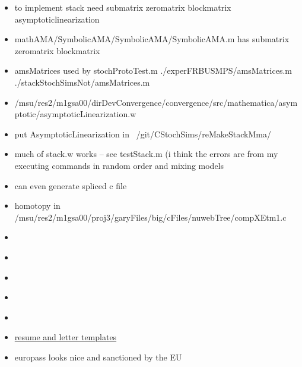 \documentclass[hyperref]{labbook}
\begin{document}
\begin{itemize}
\item to implement stack need submatrix zeromatrix  blockmatrix asymptoticlinearization
\item mathAMA/SymbolicAMA/SymbolicAMA/SymbolicAMA.m has submatrix zeromatrix  blockmatrix 
\item amsMatrices used by stochProtoTest.m  ./experFRBUSMPS/amsMatrices.m
./stackStochSimsNot/amsMatrices.m
\item /msu/res2/m1gsa00/dirDevConvergence/convergence/src/mathematica/asymptotic/asymptoticLinearization.w 
\item put AsymptoticLinearization in ~/git/CStochSims/reMakeStackMma/
\item much of stack.w works -- see testStack.m (i think the errors are from my executing commands in random order and mixing models
\item can even generate spliced c file
\item homotopy in /msu/res2/m1gsa00/proj3/garyFiles/big/cFiles/nuwebTree/compXEtm1.c

\end{itemize}


\begin{itemize}
\item 
\end{itemize}

\begin{itemize}
\item 
\end{itemize}


\begin{itemize}
\item 
\end{itemize}

\begin{itemize}
\item
\end{itemize}

\begin{itemize}
\item 
\end{itemize}

\begin{itemize}
\item \href{http://rpi.edu/dept/arc/training/latex/resumes/}{resume and letter templates}
\item europass looks nice and sanctioned by the EU
\end{itemize}
\end{document}
